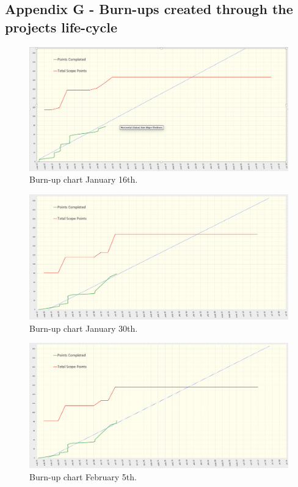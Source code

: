   \newpage
  \subsection{Appendix G - Burn-ups created through the projects life-cycle}
    \label{sec:AppendixG}

    \begin{figure}[H]
      \centering
      \includegraphics[width=12cm]{assets/outputs/burnups/01-16.png}
      \caption{Burn-up chart January 16th.}
      \label{fig:burnup1}
    \end{figure}
  
    \begin{figure}[H]
      \centering
      \includegraphics[width=12cm]{assets/outputs/burnups/01-30.png}
      \caption{Burn-up chart January 30th.}
      \label{fig:burnup2}
    \end{figure}
  
    \begin{figure}[H]
      \centering
      \includegraphics[width=12cm]{assets/outputs/burnups/02-05.png}
      \caption{Burn-up chart February 5th.}
      \label{fig:burnup3}
    \end{figure}
  
